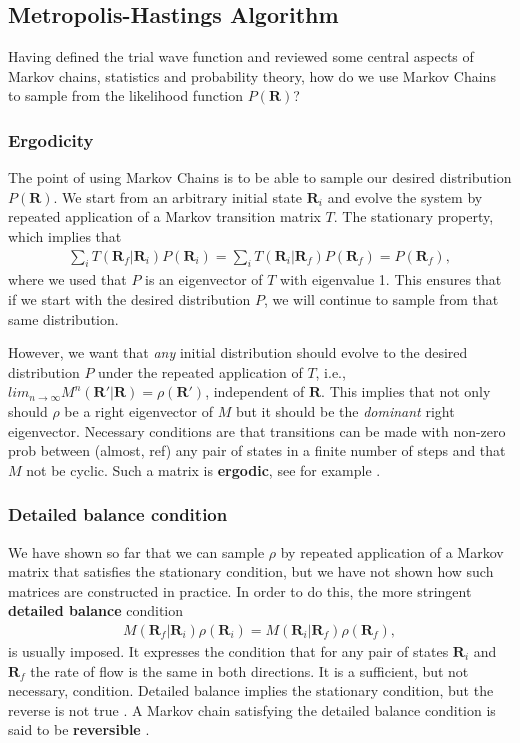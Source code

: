 \documentclass[twoside,english]{uiofysmaster}
\begin{document}
\subsection{Metropolis-Hastings Algorithm}
\label{sec:MetroHastings}
Having defined the trial wave function and reviewed some central aspects of Markov chains, statistics and probability theory, 
how do we use Markov Chains to sample from the likelihood function $P(\bm{R})$?

\subsubsection{Ergodicity}
The point of using Markov Chains is to be able to sample our desired
distribution $P(\bm{R})$. We start from an arbitrary initial state
$\bm{R}_i$ and evolve the system by repeated application of a Markov
transition matrix $T$. The stationary property, which implies that
\begin{align}
	\sum_i T(\bm{R}_f | \bm{R}_i) P (\bm{R}_i) = \sum_i T (\bm{R}_i | \bm{R}_f) P (\bm{R}_f) = P(\bm{R}_f),
\end{align}
where we used that $P$ is an eigenvector of $T$ with eigenvalue
1. This ensures that if we start with the desired distribution $P$, we
will continue to sample from that same distribution.

However, we want that \textit{any} initial distribution should evolve
to the desired distribution $P$ under the repeated application of $T$,
i.e., $lim_{n\rightarrow \infty} M^n (\bm{R}' | \bm{R}) =
\rho(\bm{R}')$, independent of $\bm{R}$.  This implies that not only
should $\rho$ be a right eigenvector of $M$ but it should be the
\textit{dominant} right eigenvector. Necessary conditions are that
transitions can be made with non-zero prob between (almost, ref) any
pair of states in a finite number of steps and that $M$ not be
cyclic. Such a matrix is \textbf{ergodic}, see for example \cite{Umrigar1999}.

\subsubsection{Detailed balance condition}
We have shown so far that we can sample $\rho$ by repeated application
of a Markov matrix that satisfies the stationary condition, but we
have not shown how such matrices are constructed in practice. In order
to do this, the more stringent \textbf{detailed balance} condition
\begin{align}
	M(\bm{R}_f | \bm{R}_i ) \rho(\bm{R}_i) = M(\bm{R}_i | \bm{R}_f ) \rho(\bm{R}_f),
\end{align}
is usually imposed.  It expresses the condition that for any pair of
states $\bm{R}_i$ and $\bm{R}_f$ the rate of flow is the same in both
directions. It is a sufficient, but not necessary, condition. Detailed
balance implies the stationary condition, but the reverse is not true
\cite{Umrigar1999}.  A Markov chain satisfying the detailed balance
condition is said to be \textbf{reversible} \cite{Toulouse2016} .
\end{document}
